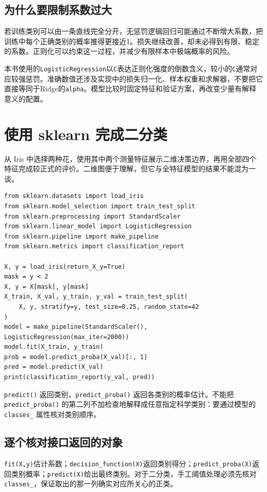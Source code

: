 \subsection{为什么要限制系数过大}
若训练类别可以由一条直线完全分开，无惩罚逻辑回归可能通过不断增大系数，把训练中每个正确类别的概率推得更接近1。损失继续改善，却未必得到有限、稳定的系数。正则化可以约束这一过程，并减少有限样本中极端概率的风险。

本书使用的\texttt{LogisticRegression}以\texttt{C}表达正则化强度的倒数含义，较小的\texttt{C}通常对应较强惩罚。准确数值还涉及实现中的损失归一化、样本权重和求解器，不要把它直接等同于Ridge的\texttt{alpha}。模型比较时固定特征和验证方案，再改变少量有解释意义的配置。

\section{使用 sklearn 完成二分类}
从 Iris 中选择两种花，使用其中两个测量特征展示二维决策边界，再用全部四个特征完成较正式的评价。二维图便于理解，但它与全特征模型的结果不能混为一谈。

\begin{lstlisting}[caption={鸢尾花两类问题的可复现逻辑回归示例}]
from sklearn.datasets import load_iris
from sklearn.model_selection import train_test_split
from sklearn.preprocessing import StandardScaler
from sklearn.linear_model import LogisticRegression
from sklearn.pipeline import make_pipeline
from sklearn.metrics import classification_report

X, y = load_iris(return_X_y=True)
mask = y < 2
X, y = X[mask], y[mask]
X_train, X_val, y_train, y_val = train_test_split(
    X, y, stratify=y, test_size=0.25, random_state=42
)
model = make_pipeline(StandardScaler(), LogisticRegression(max_iter=2000))
model.fit(X_train, y_train)
prob = model.predict_proba(X_val)[:, 1]
pred = model.predict(X_val)
print(classification_report(y_val, pred))
\end{lstlisting}

\texttt{predict()} 返回类别，\texttt{predict\_proba()} 返回各类别的概率估计。不能把 \texttt{predict\_proba()} 的第二列不加检查地解释成任意指定科学类别：要通过模型的 \texttt{classes\_} 属性核对类别顺序。


\subsection{逐个核对接口返回的对象}
\texttt{fit(X,y)}估计系数；\texttt{decision\_function(X)}返回类别得分；\texttt{predict\_proba(X)}返回类别概率；\texttt{predict(X)}给出最终类别。对于二分类，手工阈值处理必须先核对\texttt{classes\_}，保证取出的那一列确实对应所关心的正类。

